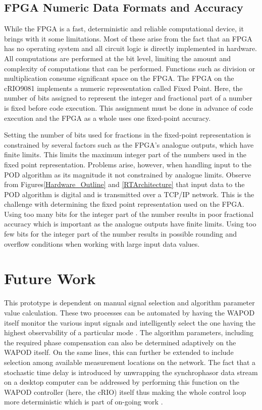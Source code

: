 \documentclass{ieeeaccess}
\begin{document}
\subsection{FPGA Numeric Data Formats and Accuracy}

While the FPGA is a fast, deterministic and reliable computational device, it brings with it some limitations. Most of these arise from the fact that an FPGA has no operating system and all circuit logic is directly implemented in hardware. All computations are performed at the bit level, limiting the amount and complexity of computations that can be performed. Functions such as division or multiplication consume significant space on the FPGA\cite{LabViewManuals}. The FPGA on the cRIO9081 implements a numeric representation called Fixed Point\cite{LabViewManuals}. Here, the number of bits assigned to represent the integer and fractional part of a number is fixed before code execution\cite{LabViewManuals}. This assignment must be done in advance of code execution and the FPGA as a whole uses one fixed-point accuracy.

Setting the number of bits used for fractions in the fixed-point representation is constrained by several factors such as the FPGA\rq{s} analogue outputs, which have finite limits. This limits the maximum integer part of the numbers used in the fixed point representation. Problems arise, however, when handling input to the POD algorithm as its magnitude it not constrained by analogue limits. Observe from Figures\ref{Hardware_Outline} and \ref{RTArchitecture} that input data to the POD algorithm is digital and is transmitted over a TCP/IP network. This is the challenge with determining the fixed point representation used on the FPGA. Using too many bits for the integer part of the number results in poor fractional accuracy which is important as the analogue outputs have finite limits. Using too few bits for the integer part of the number results in possible rounding and overflow conditions when working with large input data values.

\section{Future Work}\label{Future}

This prototype is dependent on manual signal selection and algorithm parameter value calculation. These two processes can be automated by having the WAPOD itself monitor the various input signals and intelligently select the one having the highest observability of a particular mode \cite{Yuwa}. The algorithm parameters, including the required phase compensation can also be determined adaptively on the WAPOD itself. On the same lines, this can further be extended to include selection among available measurement locations on the network. The fact that a stochastic time delay is introduced by unwrapping the synchrophasor data stream on a desktop computer can be addressed by performing this function on the WAPOD controller (here, the cRIO) itself thus making the whole control loop more deterministic which is part of on-going work \cite{Audur}. 
\end{document}
